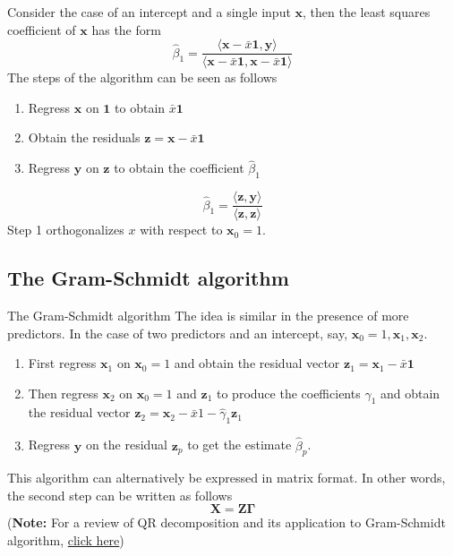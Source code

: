 \documentclass{beamer}
\newcommand{\x}{\bm{x}}
\newcommand{\X}{\bm{X}}
\newcommand{\z}{\bm{z}}
\newcommand{\y}{\bm{y}}
\begin{document}
\begin{frame}
Consider the case of an intercept and a single input $\bm{x}$, then the least squares coefficient of $\bm{x}$ has the form
\[
\hat{\beta}_1=\frac{\langle\bm{x}-\bar{x}\bm{1},\bm{y}\rangle}{\langle\bm{x}-\bar{x}\bm{1},\bm{x}-\bar{x}\bm{1}\rangle}
\]
The steps of the algorithm can be seen as follows
\begin{enumerate}
\item{} Regress $\bm{x}$ on $\bm{1}$ to obtain $\bar{x}\bm{1}$

\item{} Obtain the residuals $\bm{z}=\bm{x}-\bar{x}\bm{1}$

\item{} Regress $\bm{y}$ on $\bm{z}$ to obtain the coefficient $\hat{\beta}_1$
\end{enumerate}
\[
\hat{\beta}_1=\frac{\langle\bm{z},\bm{y}\rangle}{\langle\bm{z},\bm{z}\rangle}
\]
Step 1 orthogonalizes $x$ with respect to $\bm{x}_0=1$.  
\end{frame}
\subsection{The Gram-Schmidt algorithm}
\begin{frame}{The Gram-Schmidt algorithm}
The idea is similar in the presence of more predictors. In the case of two predictors and an intercept, say, $\bm{x}_0=1, \bm{x}_1,\bm{x}_2$.
\begin{enumerate}
 \item{} First regress $\bm{x}_1$ on $\bm{x}_0=1$ and obtain the residual vector $\bm{z}_1=\bm{x}_1-\bar{x}\bm{1}$

\item{} Then regress $\bm{x}_2$ on $\x_0=1$ and $\z_1$ to produce the coefficients $\hat{\gamma}_1$ and obtain the residual vector $\z_2=\x_2-\bar{x}1-\hat{\gamma}_1\z_1$

\item{} Regress $\y$ on the residual $\z_p$ to get the estimate $\hat{\beta}_p$.
\end{enumerate}
This algorithm can alternatively be expressed in matrix format. In other words, the second step can be written as follows
\[
\X=\bm{Z}\bm{\Gamma}
\]
(\textbf{Note:} For a review of QR decomposition and its application to Gram-Schmidt algorithm, \href{http://www.seas.ucla.edu/~vandenbe/133A/lectures/qr.pdf}{click here})
\end{frame}
\end{document}
